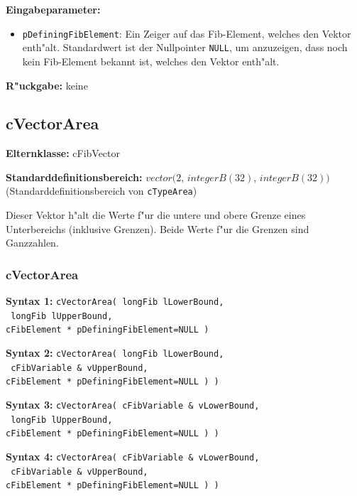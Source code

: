 
\bigskip\noindent
\textbf{Eingabeparameter:}
\begin{itemize}
 \item \verb|pDefiningFibElement|: Ein Zeiger auf das Fib-Element, welches den Vektor enth"alt. Standardwert ist der Nullpointer \verb|NULL|, um anzuzeigen, dass noch kein Fib-Element bekannt ist, welches den Vektor enth"alt.
\end{itemize}


\bigskip\noindent
\textbf{R"uckgabe:} keine


\subsection{cVectorArea}

\bigskip\noindent
\textbf{Elternklasse:} cFibVector

\bigskip\noindent
\textbf{Standarddefinitionsbereich:} $vector( 2$, $integerB(32)$,  $integerB(32) )$ (Standarddefinitionsbereich von \verb|cTypeArea|)

\bigskip\noindent
Dieser Vektor h"alt die Werte f"ur die untere und obere Grenze eines Unterbereichs (inklusive Grenzen). Beide Werte f"ur die Grenzen sind Ganzzahlen.


\subsubsection{cVectorArea}

\textbf{Syntax 1:} \verb|cVectorArea( longFib lLowerBound,| \\\verb| longFib lUpperBound, | \\\verb|cFibElement * pDefiningFibElement=NULL )|

\noindent
\textbf{Syntax 2:} \verb|cVectorArea( longFib lLowerBound,| \\\verb| cFibVariable & vUpperBound, | \\\verb|cFibElement * pDefiningFibElement=NULL ) )|

\noindent
\textbf{Syntax 3:} \verb|cVectorArea( cFibVariable & vLowerBound,| \\\verb| longFib lUpperBound, | \\\verb|cFibElement * pDefiningFibElement=NULL ) )|

\noindent
\textbf{Syntax 4:} \verb|cVectorArea( cFibVariable & vLowerBound,| \\\verb| cFibVariable & vUpperBound, | \\\verb|cFibElement * pDefiningFibElement=NULL ) )|

